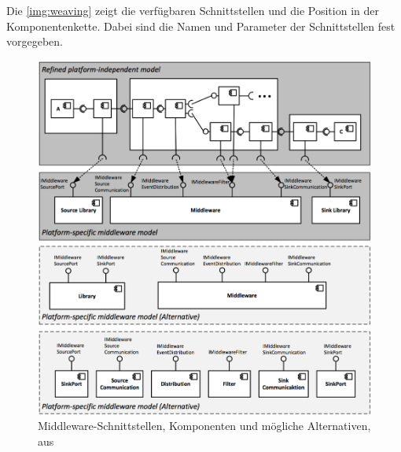 Die \autoref{img:weaving} zeigt die verfügbaren Schnittstellen und die Position in der Komponentenkette. Dabei sind die Namen und Parameter der Schnittstellen fest vorgegeben. 

\begin{figure}
\center
  \includegraphics[width=1\textwidth]{images/grundlagen/middleware-model-weaving.png}
  \caption{Middleware-Schnittstellen, Komponenten und mögliche Alternativen, aus \cite{Rathfelder2013}}
  \label{img:weaving}
\end{figure}


